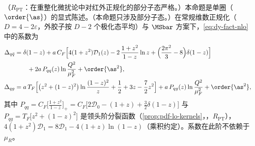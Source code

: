 \begin{proposition}\label{prop:dy-nlo}
（$R_{\mathrm{PT}}$：在重整化微扰论中对红外正规化的部分子态严格。）本命题是单圈（$\order{\as}$）的显式陈述。（本命题只涉及部分子态。）在常规维数正规化（$D=4-2\varepsilon$，外胶子按 $D-2$ 个极化态平均）与 $\MSbar$ 方案下，\cref{eq:dy-fact-nlo}中的系数为
\begin{align}
\Delta_{q\bar q}&=\delta(1-z)+a\,C_F\Big[4(1+z^2)\mathcal D_1(z)-2\,\frac{1+z^2}{1-z}\ln z+\Big(\frac{2\pi^2}{3}-8\Big)\delta(1-z)\Big]\nonumber\\
&\qquad+2a\,P_{qq}(z)\ln\frac{Q^2}{\mu_F^2}+\order{\as^2},\label{eq:dy-Dqq}\\
\Delta_{qg}&=a\,T_F\Big[\big(z^2+(1-z)^2\big)\ln\frac{(1-z)^2}{z}+\frac12+3z-\frac72z^2\Big]+a\,P_{qg}(z)\ln\frac{Q^2}{\mu_F^2}+\order{\as^2},\label{eq:dy-Dqg}
\end{align}
其中 $P_{qq}=C_F\big[\frac{1+z^2}{1-z}\big]_+=C_F\big[2\mathcal D_0-(1+z)+\frac32\delta(1-z)\big]$ 与 $P_{qg}=T_F\big[z^2+(1-z)^2\big]$ 是领头阶分裂函数（\cref{prop:pdf-lo-kernels}，\tagR，$R_{\mathrm{PT}}$），$4(1+z^2)\mathcal D_1=8\mathcal D_1-4(1+z)\ln(1-z)$（乘积约定）。系数在此阶不依赖于 $\mu_R$。
\end{proposition}

